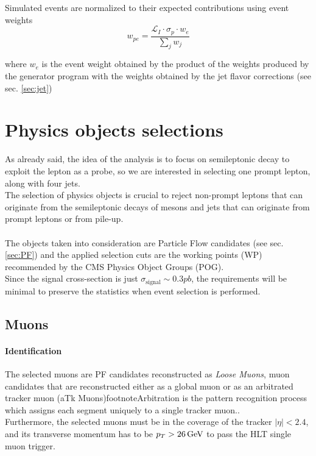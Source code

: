 Simulated events are normalized to
their expected contributions using event weights 
\begin{equation}
    w_{pe}=\frac{\mathcal{L}_I \cdot \sigma_p \cdot w_{e} }{\sum_j w_{j}}
\end{equation}

where $w_{e}$ is the event weight obtained by the product of the weights produced by the generator program with the weights obtained by the jet flavor corrections (see sec. \ref{sec:jet})   

\section{Physics objects selections}
As already said, the idea of the analysis is to focus on semileptonic decay to exploit the lepton as a probe, so we are interested in selecting one prompt lepton, along with four jets.\\
The selection of physics objects is crucial to reject non-prompt leptons that can originate from the semileptonic decays of mesons and jets that can originate from prompt leptons or from pile-up.\\
\\
The objects taken into consideration are Particle Flow candidates (see sec. \ref{sec:PF}) and the applied selection cuts are the working points (WP) recommended by the CMS Physics Object Groups (POG).\\
Since the signal cross-section is just $\sigma_{\text{signal}}\sim 0.3 pb$, the requirements will be minimal to preserve the statistics when event selection is performed. 
\subsection{Muons}
\paragraph*{Identification}
The selected muons are PF candidates reconstructed as \emph{Loose Muons}, \ie muon candidates that are reconstructed either as a global muon or as an arbitrated tracker muon (aTk Muons)footnote{Arbitration is the pattern recognition process which assigns each segment uniquely to a single tracker muon.}.\\
Furthermore, the selected muons must be in the coverage of the tracker $|\eta|<2.4$, and its transverse momentum has to be $p_T>26{\,\text{Ge\hspace{-.08em}V}}$ to pass the HLT single muon trigger. 
